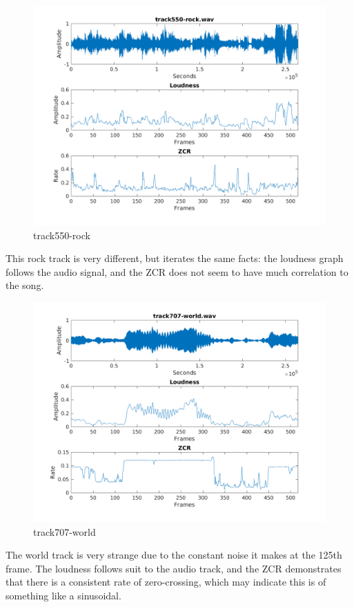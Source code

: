 \documentclass[11pt, a4paper]{article}
\begin{document}
\begin{figure}[H]
    \centering
    \includegraphics[width=.8\textwidth]{track550-rock-timedomain.png}
    \caption{track550-rock}
\end{figure}

This rock track is very different, but iterates the same facts: the loudness graph follows the audio signal, and the ZCR does not seem to have much correlation to the song. 


\begin{figure}[H]
    \centering
    \includegraphics[width=.8\textwidth]{track707-world-timedomain.png}
    \caption{track707-world}
\end{figure}

The world track is very strange due to the constant noise it makes at the 125th frame. The loudness follows suit to the audio track, and the ZCR demonstrates that there is a consistent rate of zero-crossing, which may indicate this is of something like a sinusoidal. 
\end{document}
